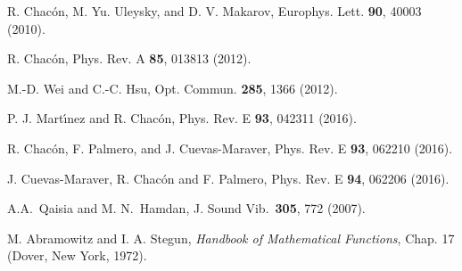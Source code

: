 \documentclass[showpacs,preprintnumbers,10pt,onecolumn]{revtex4}%
\begin{document}
\begin{thebibliography}{99}
R. Chac\'{o}n, M. Yu. Uleysky, and D. V. Makarov, Europhys. Lett.
\textbf{90}, 40003 (2010).

R. Chac\'{o}n, Phys. Rev. A \textbf{85}, 013813 (2012).

M.-D. Wei and C.-C. Hsu, Opt. Commun. \textbf{285}, 1366 (2012).

P. J. Mart\'{\i}nez and R. Chac\'{o}n, Phys. Rev. E \textbf{93},
042311 (2016).

R. Chac\'{o}n, F. Palmero, and J. Cuevas-Maraver, Phys. Rev. E
\textbf{93}, 062210 (2016).

J. Cuevas-Maraver, R. Chac\'{o}n and F. Palmero, Phys. Rev. E
\textbf{94}, 062206 (2016).

A.A.~Qaisia and M. N.~Hamdan, J. Sound Vib.~\textbf{305}, 772 (2007).

M. Abramowitz and I. A. Stegun, \textit{Handbook of Mathematical
Functions}, Chap. 17 (Dover, New York, 1972).

\end{thebibliography}
\end{document}
